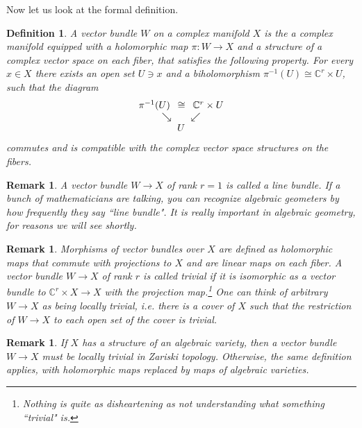 \documentclass[11pt]{article}
\numberwithin{equation}{section}
\numberwithin{footnote}{section}
\newtheorem{defn}[thm]{Definition}
\newtheorem{rem}[thm]{Remark}
\newcommand{\blue}{\color{blue}}
\newcommand{\C}{{\mathbb C}}
\begin{document}
Now let us look at the formal definition.

\smallskip
\begin{defn}\label{vector.bundle}
A vector bundle $W$ on a complex manifold $X$ is the a complex manifold equipped with a holomorphic map
$\pi:W\to X$ and a structure of a complex vector space on each fiber, that satisfies the following property. For every $x\in X$ there exists an open set $U\ni x$ and a biholomorphism $\pi^{-1}(U)\cong \C^r\times U$, such that the diagram
\begin{align}\label{vb}
\begin{array}{c}
\pi^{-1}(U) \hskip 5pt \cong \hskip 5pt  \C^r\times U\\
\searrow\hskip 20pt  \swarrow\\
U
\end{array}
\end{align}
commutes and is compatible with the complex vector space structures on the fibers.
\end{defn}


\smallskip
\begin{rem}\label{line.bundle}
A vector bundle $W\to X$ of rank $r=1$ is called a line bundle.
If a bunch of mathematicians are talking, you can recognize algebraic geometers by how frequently they say ``line bundle". It is really  important in algebraic geometry, for reasons we will see shortly.
\end{rem}

\smallskip
\begin{rem}
Morphisms of vector bundles over $X$ are defined as holomorphic maps that commute with projections to $X$ and are linear maps on each fiber.
A vector bundle $W\to X$ of rank $r$ is called  {\blue trivial} if it is isomorphic as a vector bundle to $\C^r\times X\to X$ with the projection map.\footnote{ Nothing is quite as disheartening as not understanding what something ``trivial" is.} One can think of arbitrary $W\to X$ as being locally trivial, i.e. there is a cover of $X$ such that the restriction of $W\to X$ to each open set of the cover is trivial.
\end{rem}

\smallskip
\begin{rem}
If $X$ has a structure of an algebraic variety, then a vector bundle $W\to X$ must be locally trivial in Zariski topology. Otherwise, the same definition applies, with holomorphic maps replaced by maps of algebraic varieties.
\end{rem}
\end{document}
